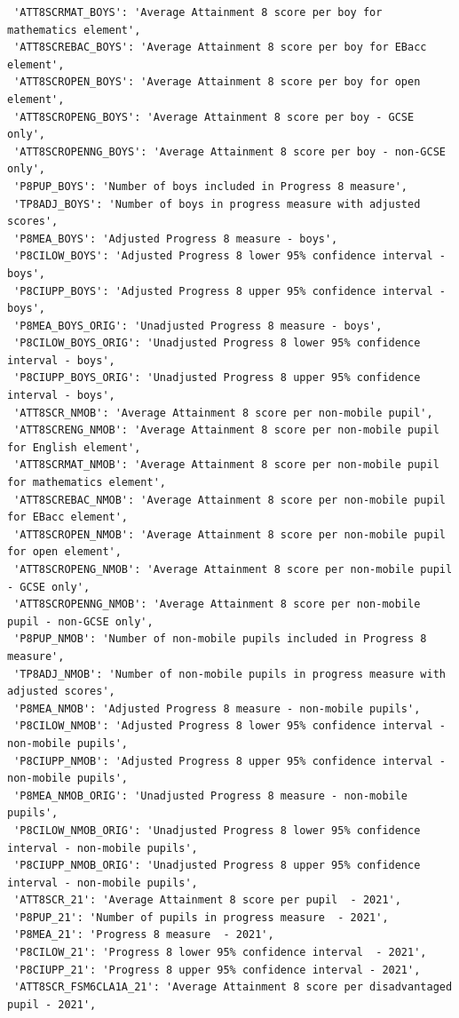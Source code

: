 \documentclass[
  letterpaper,
  DIV=11,
  numbers=noendperiod]{scrartcl}
\begin{document}
\begin{verbatim}
 'ATT8SCRMAT_BOYS': 'Average Attainment 8 score per boy for mathematics element',
 'ATT8SCREBAC_BOYS': 'Average Attainment 8 score per boy for EBacc element',
 'ATT8SCROPEN_BOYS': 'Average Attainment 8 score per boy for open element',
 'ATT8SCROPENG_BOYS': 'Average Attainment 8 score per boy - GCSE only',
 'ATT8SCROPENNG_BOYS': 'Average Attainment 8 score per boy - non-GCSE only',
 'P8PUP_BOYS': 'Number of boys included in Progress 8 measure',
 'TP8ADJ_BOYS': 'Number of boys in progress measure with adjusted scores',
 'P8MEA_BOYS': 'Adjusted Progress 8 measure - boys',
 'P8CILOW_BOYS': 'Adjusted Progress 8 lower 95% confidence interval - boys',
 'P8CIUPP_BOYS': 'Adjusted Progress 8 upper 95% confidence interval - boys',
 'P8MEA_BOYS_ORIG': 'Unadjusted Progress 8 measure - boys',
 'P8CILOW_BOYS_ORIG': 'Unadjusted Progress 8 lower 95% confidence interval - boys',
 'P8CIUPP_BOYS_ORIG': 'Unadjusted Progress 8 upper 95% confidence interval - boys',
 'ATT8SCR_NMOB': 'Average Attainment 8 score per non-mobile pupil',
 'ATT8SCRENG_NMOB': 'Average Attainment 8 score per non-mobile pupil for English element',
 'ATT8SCRMAT_NMOB': 'Average Attainment 8 score per non-mobile pupil for mathematics element',
 'ATT8SCREBAC_NMOB': 'Average Attainment 8 score per non-mobile pupil for EBacc element',
 'ATT8SCROPEN_NMOB': 'Average Attainment 8 score per non-mobile pupil for open element',
 'ATT8SCROPENG_NMOB': 'Average Attainment 8 score per non-mobile pupil - GCSE only',
 'ATT8SCROPENNG_NMOB': 'Average Attainment 8 score per non-mobile pupil - non-GCSE only',
 'P8PUP_NMOB': 'Number of non-mobile pupils included in Progress 8 measure',
 'TP8ADJ_NMOB': 'Number of non-mobile pupils in progress measure with adjusted scores',
 'P8MEA_NMOB': 'Adjusted Progress 8 measure - non-mobile pupils',
 'P8CILOW_NMOB': 'Adjusted Progress 8 lower 95% confidence interval - non-mobile pupils',
 'P8CIUPP_NMOB': 'Adjusted Progress 8 upper 95% confidence interval - non-mobile pupils',
 'P8MEA_NMOB_ORIG': 'Unadjusted Progress 8 measure - non-mobile pupils',
 'P8CILOW_NMOB_ORIG': 'Unadjusted Progress 8 lower 95% confidence interval - non-mobile pupils',
 'P8CIUPP_NMOB_ORIG': 'Unadjusted Progress 8 upper 95% confidence interval - non-mobile pupils',
 'ATT8SCR_21': 'Average Attainment 8 score per pupil  - 2021',
 'P8PUP_21': 'Number of pupils in progress measure  - 2021',
 'P8MEA_21': 'Progress 8 measure  - 2021',
 'P8CILOW_21': 'Progress 8 lower 95% confidence interval  - 2021',
 'P8CIUPP_21': 'Progress 8 upper 95% confidence interval - 2021',
 'ATT8SCR_FSM6CLA1A_21': 'Average Attainment 8 score per disadvantaged pupil - 2021',

\end{verbatim}
\end{document}
